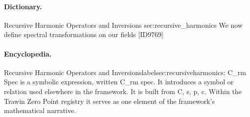 \paragraph{Dictionary.}
Recursive Harmonic Operators and Inversions sec:recursive\_harmonics We now define spectral transformations on our fields [ID9769]

\paragraph{Encyclopedia.}
Recursive Harmonic Operators and Inversionslabelsec:recursiveharmonics: C\_rm Spec is a symbolic expression, written C\_rm spec. It introduces a symbol or relation used elsewhere in the framework. It is built from C, s, p, c. Within the Trawin Zero Point registry it serves as one element of the framework's mathematical narrative.
